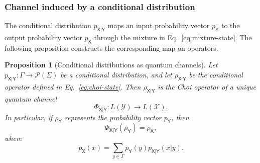 \documentclass[
    aps,
    pra,
    reprint,
    superscriptaddress,
    nofootinbib
]{revtex4-2}
\theoremstyle{definition}
\theoremstyle{plain}
\newtheorem{proposition}[theorem]{Proposition}
\begin{document}
\subsubsection{Channel induced by a conditional distribution}

The conditional distribution $p_{\mathsf{X}|\mathsf{Y}}$ maps an input
probability vector $p_{\mathsf{Y}}$ to the output probability vector
$p_{\mathsf{X}}$ through the mixture in
Eq.~\eqref{eq:mixture-state}. The following proposition constructs the
corresponding map on operators.

\begin{proposition}[Conditional distributions as quantum channels]
    \label{prop:conditional-distribution-channel}
    Let $p_{\mathsf{X}|\mathsf{Y}}:\Gamma\to\mathcal{P}(\Sigma)$ be a
    conditional distribution, and let $\rho_{\mathsf{X}|\mathsf{Y}}$ be
    the conditional operator defined in Eq.~\eqref{eq:choi-state}. Then
    $\rho_{\mathsf{X}|\mathsf{Y}}$ is the Choi operator of a unique
    quantum channel
    \begin{equation}
        \Phi_{\mathsf{X}|\mathsf{Y}}:
        L(\mathcal{Y})\to L(\mathcal{X}).
    \end{equation}
    In particular, if $\rho_{\mathsf{Y}}$ represents the probability
    vector $p_{\mathsf{Y}}$, then
    \begin{equation}
        \Phi_{\mathsf{X}|\mathsf{Y}}(\rho_{\mathsf{Y}})
        =
        \rho_{\mathsf{X}},
    \end{equation}
    where
    \begin{equation}
        p_{\mathsf{X}}(x)
        =
        \sum_{y\in\Gamma}
        p_{\mathsf{Y}}(y)
        p_{\mathsf{X}|\mathsf{Y}}(x|y).
    \end{equation}
\end{proposition}
\end{document}
